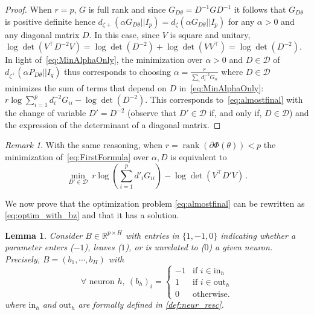 \documentclass{article}
\theoremstyle{plain}
\newtheorem{lemma}[theorem]{Lemma}
\theoremstyle{definition}
\theoremstyle{remark}
\newtheorem{remark}[theorem]{Remark}
\def\Dcal{\mathcal{D}}
\def\rank{\operatorname{rank}}
\def\R{{\mathbb{R}}}
\def\Dcal{{\mathcal{D}}}
\begin{document}
{\begin{proof}
When $r = p$, $G$ is full rank and since $G_{D \theta} = D^{-1} G D^{-1}$ it follows that $G_{D \theta}$ is positive definite hence $d_{\zeta+}(\alpha G_{D\theta}|| I_{p}) = d_{\zeta}(\alpha G_{D\theta}|| I_{p})$ for any $\alpha>0$ and any diagonal matrix $D$. 
In this case, since $V$ is square and unitary, $\log \det (V^{\top} D^{-2} V) =  \log \det (D^{-2}) + \log \det (VV^{\top}) = \log \det (D^{-2})$. In light of~\eqref{eq:MinAlphaOnly}, the minimization over $\alpha>0$ and $D \in \mathcal{D}$ of $d_{\zeta^+}(\alpha P_{D \theta}|| I_q)$ thus corresponds to choosing $\alpha = \frac{r}{\sum_i d_i^{-2} G_{ii}}$ where $D \in \mathcal{D}$ minimizes the sum of terms that depend on $D$ in~\eqref{eq:MinAlphaOnly}: $r \log \sum_{i=1}^{p} d_{i}^{-2} G_{ii} -\log \det (D^{-2})$. 
This corresponds to~\eqref{eq:almostfinal} 
with the change of variable $D' = D^{-2}$ (observe that $D' \in \mathcal{D}$ if, and only if, $D \in \mathcal{D}$) and the expression of the determinant of a diagonal matrix.
\end{proof}
\begin{remark}
    With the same reasoning, when $r=\rank(\partial \Phi(\theta)) < p$ the minimization of~\eqref{eq:FirstFormula} over $\alpha,D$ is equivalent to 
     \begin{equation}
    \min_{D'\in \Dcal} \ r \log(\sum_{i=1}^p d'_i G_{ii}) - \log {\det}(V^\top D' V)\,.
    \end{equation}
\end{remark}


We now prove that the optimization problem \eqref{eq:almostfinal} can be rewritten as \eqref{eq:optim_with_bz} and that it has a solution. 
\begin{lemma}
    \label{lemma:rewriting}
    Consider $B \in \R^{p \times H}$ with entries in $\{1,-1,0\}$ indicating whether a parameter enters ($-1$), 
leaves ($1$), or is unrelated to ($0$) a given neuron.
Precisely, $B = (b_1, \cdots, b_H)$ with
\begin{equation}
    \label{eq:def_B}
\forall \text{ neuron } h, \
    (b_h)_{i} = \begin{cases}
        -1 & \text{if } i \in \mathrm{in}_h\\
        1 & \text{if } i \in \mathrm{out}_h\\
        0 & \text{otherwise}.
    \end{cases}
\end{equation}
where $\mathrm{in}_h$ and $\mathrm{out}_h$ are formally defined in \cref{def:neur_resc}.


\end{lemma}}
\end{document}
